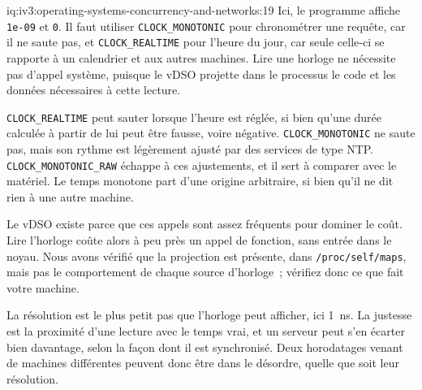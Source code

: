 \begin{solution}{iq:iv3:operating-systems-concurrency-and-networks:19}
Ici, le programme affiche \texttt{1e-09} et \texttt{0}. Il faut utiliser \texttt{CLOCK\_MONOTONIC} pour chronométrer une requête, car il ne saute pas, et \texttt{CLOCK\_REALTIME} pour l'heure du jour, car seule celle-ci se rapporte à un calendrier et aux autres machines. Lire une horloge ne nécessite pas d'appel système, puisque le vDSO projette dans le processus le code et les données nécessaires à cette lecture.

\texttt{CLOCK\_REALTIME} peut sauter lorsque l'heure est réglée, si bien qu'une durée calculée à partir de lui peut être fausse, voire négative. \texttt{CLOCK\_MONOTONIC} ne saute pas, mais son rythme est légèrement ajusté par des services de type NTP. \texttt{CLOCK\_MONOTONIC\_RAW} échappe à ces ajustements, et il sert à comparer avec le matériel. Le temps monotone part d'une origine arbitraire, si bien qu'il ne dit rien à une autre machine.

Le vDSO existe parce que ces appels sont assez fréquents pour dominer le coût. Lire l'horloge coûte alors à peu près un appel de fonction, sans entrée dans le noyau. Nous avons vérifié que la projection est présente, dans \texttt{/proc/self/maps}, mais pas le comportement de chaque source d'horloge~; vérifiez donc ce que fait votre machine.

La résolution est le plus petit pas que l'horloge peut afficher, ici 1~ns. La justesse est la proximité d'une lecture avec le temps vrai, et un serveur peut s'en écarter bien davantage, selon la façon dont il est synchronisé. Deux horodatages venant de machines différentes peuvent donc être dans le désordre, quelle que soit leur résolution.

\end{solution}

